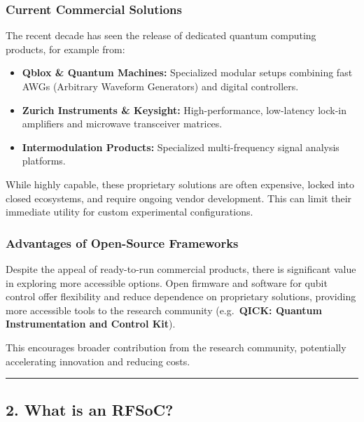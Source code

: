 \documentclass[
]{article}
\providecommand{\tightlist}{%
  \setlength{\itemsep}{0pt}\setlength{\parskip}{0pt}}
\begin{document}
\subsubsection{Current Commercial
Solutions}\label{current-commercial-solutions}

The recent decade has seen the release of dedicated quantum computing
products, for example from:

\begin{itemize}
\tightlist
\item
  \textbf{Qblox \& Quantum Machines:} Specialized modular setups
  combining fast AWGs (Arbitrary Waveform Generators) and digital
  controllers.
\item
  \textbf{Zurich Instruments \& Keysight:} High-performance, low-latency
  lock-in amplifiers and microwave transceiver matrices.
\item
  \textbf{Intermodulation Products:} Specialized multi-frequency signal
  analysis platforms.
\end{itemize}

While highly capable, these proprietary solutions are often expensive,
locked into closed ecosystems, and require ongoing vendor development.
This can limit their immediate utility for custom experimental
configurations.

\subsubsection{Advantages of Open-Source
Frameworks}\label{advantages-of-open-source-frameworks}

Despite the appeal of ready-to-run commercial products, there is
significant value in exploring more accessible options. Open firmware
and software for qubit control offer flexibility and reduce dependence
on proprietary solutions, providing more accessible tools to the
research community (e.g.~\textbf{QICK: Quantum Instrumentation and
Control Kit}).

This encourages broader contribution from the research community,
potentially accelerating innovation and reducing costs.

\begin{center}\rule{0.5\linewidth}{0.5pt}\end{center}

\subsection{2. What is an RFSoC?}\label{what-is-an-rfsoc}
\end{document}
